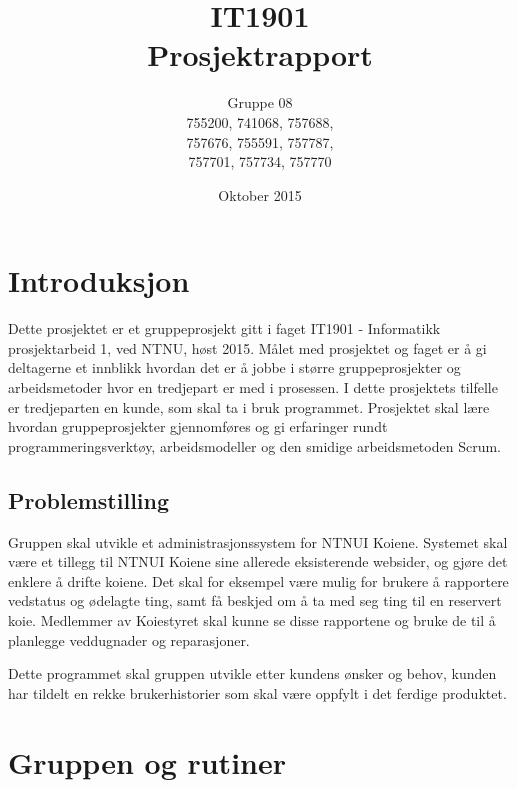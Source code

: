 \documentclass[12pt,a4paper,norsk]{article}
\title{IT1901 \\ Prosjektrapport}
\author{Gruppe 08 \\ 
    755200, 741068, 757688,\\
    757676, 755591, 757787, \\
    757701, 757734, 757770}
\date{Oktober 2015}
\begin{document}
	\maketitle
	\newpage
	\tableofcontents
	\newpage
	\section{Introduksjon}



Dette prosjektet er et gruppeprosjekt gitt i faget IT1901 - Informatikk prosjektarbeid 1, ved NTNU, høst 2015. Målet med prosjektet og faget er å gi deltagerne et innblikk hvordan det er å jobbe i større gruppeprosjekter og arbeidsmetoder hvor en tredjepart er med i prosessen. I dette prosjektets tilfelle er tredjeparten en kunde, som skal ta i bruk programmet. Prosjektet skal lære hvordan gruppeprosjekter gjennomføres og gi erfaringer rundt programmeringsverktøy, arbeidsmodeller og den smidige arbeidsmetoden Scrum.

\subsection{Problemstilling}

Gruppen skal utvikle et administrasjonssystem for NTNUI Koiene. Systemet skal være et tillegg til NTNUI Koiene sine allerede eksisterende websider, og gjøre det enklere å drifte koiene. Det skal for eksempel være mulig for brukere å rapportere vedstatus og ødelagte ting, samt få beskjed om å ta med seg ting til en reservert koie. Medlemmer av Koiestyret skal kunne se disse rapportene og bruke de til å planlegge veddugnader og reparasjoner.

Dette programmet skal gruppen utvikle etter kundens ønsker og behov, kunden har tildelt en rekke brukerhistorier som skal være oppfylt i det ferdige produktet.

	\section{Gruppen og rutiner}
	
\end{document}
